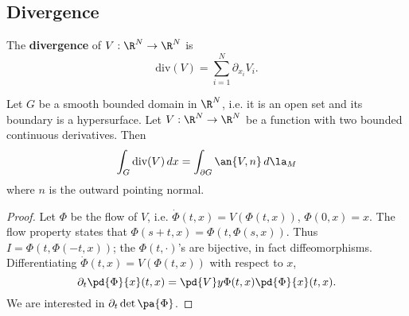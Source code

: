 
\subsection{Divergence}
\begin{df}
The \textbf{divergence} of $V:\R^N\to \R^N$ is
\[
\text{div}(V)=\sum_{i=1}^N\partial_{x_i}V_i.
\]
\end{df}
\begin{thm}
Let $G$ be a smooth bounded domain in $\R^N$, i.e. it is an open set and its boundary is a hypersurface. Let $V:\R^N\to \R^N$ be a function with two bounded continuous derivatives. Then
\[
\int_{G}\text{div}(V)\,dx=\int_{\partial G} \an{V,n}\,d\la_{M}
\]
where $n$ is the outward pointing normal.
\end{thm}
\begin{proof}
Let $\Phi$ be the flow of $V$, i.e. $\dot{\Phi}(t,x)=V(\Phi(t,x))$, $\Phi(0,x)=x$. The flow property states that $\Phi(s+t,x)=\Phi(t,\Phi(s,x))$. Thus $I=\Phi(t,\Phi(-t,x))$; the $\Phi(t,\cdot)$'s are bijective, in fact diffeomorphisms. Differentiating $\dot{\Phi}(t,x)=V(\Phi(t,x))$ with respect to $x$,
\begin{equation}\label{diffxv}
\partial_t\pd{\Phi}{x}(t,x)=\pd{V}y\Phi(t,x)\pd{\Phi}{x}(t,x).
\end{equation}
We are interested in $\partial_t\det\pa{\Phi}$.


\end{proof}

